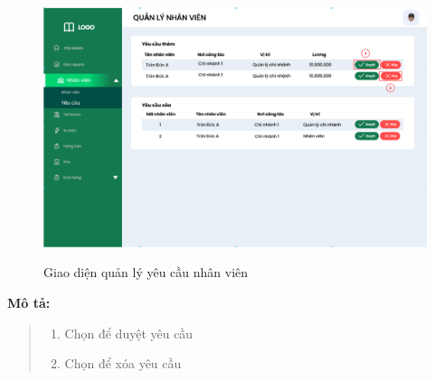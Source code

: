             \begin{figure}[!htp]
                \centering
                \includegraphics[width=12cm]{img/UI/admin/staff_request.png}
                \label{26}
                \newline
                \caption{Giao diện quản lý yêu cầu nhân viên}
            \end{figure}
            \textbf{Mô tả:}  
            \begin{quote}
                \begin{enumerate}
                    \item Chọn để duyệt yêu cầu
                    \item Chọn để xóa yêu cầu
                \end{enumerate}
            \end{quote}
        

